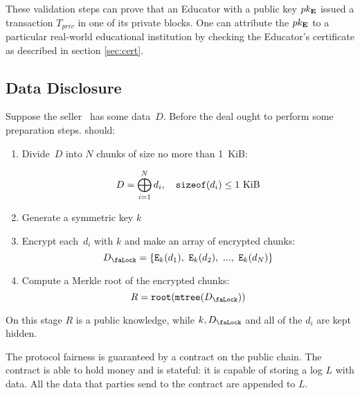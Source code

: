 These validation steps can prove that an Educator with a public key $pk_{\mathbf{E}}$ issued a transaction $T_{priv}$ in one of its private blocks. One can attribute the $pk_{\mathbf{E}}$ to a particular real-world educational institution by checking the Educator's certificate as described in section \ref{sec:cert}.

\subsection{Data Disclosure}
\label{sec:DataDisclosure}

Suppose the seller~ has some data~$D$. Before the deal  ought to perform some preparation steps.  should:
\begin{enumerate}
\item Divide~$D$ into $N$ chunks of size no more than 1~KiB:

\begin{equation}
D = \bigoplus_{i=1}^N d_i, \quad \mathtt{sizeof}(d_i) \leq 1~\mathrm{KiB}
\end{equation}

\item Generate a symmetric key $k$
\item Encrypt each~$d_i$ with $k$ and make an array of encrypted chunks:
\begin{equation}
\Lock = \{ \Encrypt_\Key{k}(d_1),\ \Encrypt_\Key{k}(d_2),\ ...,\ \Encrypt_\Key{k}(d_N) \}
\end{equation}

\item Compute a Merkle root of the encrypted chunks:
\begin{equation}
R = \Root(\MerkleTree(\Lock))
\end{equation}

\end{enumerate}

On this stage $R$ is a public knowledge, while $k, \Lock$ and all of the $d_i$ are kept hidden.

The protocol fairness is guaranteed by a contract on the public chain. The contract is able to hold money and is stateful: it is capable of storing a log $L$ with data. All the data that parties send to the contract are appended to $L$.

